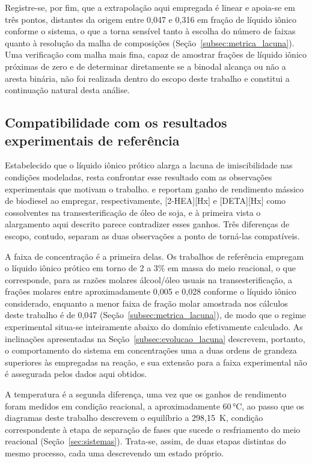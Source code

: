 Registre-se, por fim, que a extrapolação aqui empregada é linear e apoia-se em três pontos, distantes da origem entre 0,047 e 0,316 em fração de líquido iônico conforme o sistema, o que a torna sensível tanto à escolha do número de faixas quanto à resolução da malha de composições (Seção~\ref{subsec:metrica_lacuna}). Uma verificação com malha mais fina, capaz de amostrar frações de líquido iônico próximas de zero e de determinar diretamente se a binodal alcança ou não a aresta binária, não foi realizada dentro do escopo deste trabalho e constitui a continuação natural desta análise.

\subsection{Compatibilidade com os resultados experimentais de referência}
\label{subsec:regime_concentracao}

Estabelecido que o líquido iônico prótico alarga a lacuna de imiscibilidade nas condições modeladas, resta confrontar esse resultado com as observações experimentais que motivam o trabalho.  e  reportam ganho de rendimento mássico de biodiesel ao empregar, respectivamente, [2-HEA][Hx] e [DETA][Hx] como cossolventes na transesterificação de óleo de soja, e à primeira vista o alargamento aqui descrito parece contradizer esses ganhos. Três diferenças de escopo, contudo, separam as duas observações a ponto de torná-las compatíveis.

A faixa de concentração é a primeira delas. Os trabalhos de referência empregam o líquido iônico prótico em torno de 2 a 3\% em massa do meio reacional, o que corresponde, para as razões molares álcool/óleo usuais na transesterificação, a frações molares entre aproximadamente 0,005 e 0,028 conforme o líquido iônico considerado, enquanto a menor faixa de fração molar amostrada nos cálculos deste trabalho é de 0,047 (Seção~\ref{subsec:metrica_lacuna}), de modo que o regime experimental situa-se inteiramente abaixo do domínio efetivamente calculado. As inclinações apresentadas na Seção~\ref{subsec:evolucao_lacuna} descrevem, portanto, o comportamento do sistema em concentrações uma a duas ordens de grandeza superiores às empregadas na reação, e sua extensão para a faixa experimental não é assegurada pelos dados aqui obtidos.

A temperatura é a segunda diferença, uma vez que os ganhos de rendimento foram medidos em condição reacional, a aproximadamente 60\,°C, ao passo que os diagramas deste trabalho descrevem o equilíbrio a 298,15~K, condição correspondente à etapa de separação de fases que sucede o resfriamento do meio reacional (Seção~\ref{sec:sistemas}). Trata-se, assim, de duas etapas distintas do mesmo processo, cada uma descrevendo um estado próprio.

